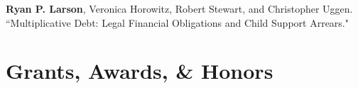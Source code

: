 \documentclass[letterpaper]{article}
\newenvironment{publist}{%
  \begin{list}{}{%
    \setlength{\leftmargin}{0cm}   %
    \setlength{\labelwidth}{2cm}     %
    \setlength{\labelsep}{0.5cm}     %
  }%
}{%
  \end{list}%
}
\begin{document}
\begin{publist}

\item \textbf{Ryan P. Larson}, Veronica Horowitz, Robert Stewart, and Christopher Uggen. ``Multiplicative Debt: Legal Financial Obligations and Child Support Arrears."




\end{publist}

\section*{\textbf{Grants, Awards, \& Honors}}
\end{document}
